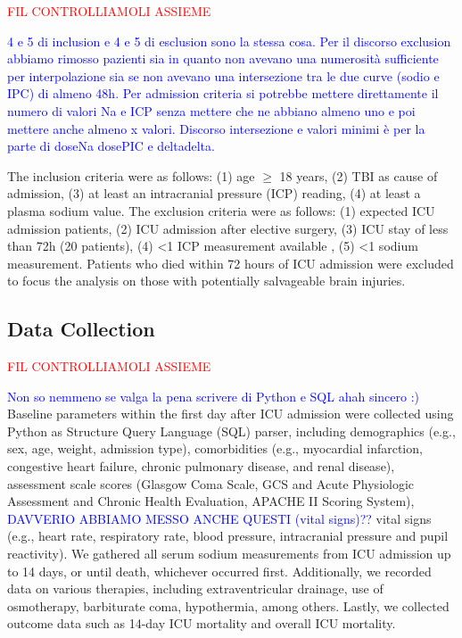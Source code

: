 \textcolor{red}{FIL CONTROLLIAMOLI ASSIEME}

\textcolor{blue}{4 e 5 di inclusion e 4 e 5 di esclusion sono la stessa cosa. Per il discorso exclusion abbiamo rimosso pazienti sia in quanto non avevano una numerosità sufficiente per interpolazione sia se non avevano una intersezione tra le due curve (sodio e IPC) di almeno 48h. Per admission criteria si potrebbe mettere direttamente il numero di valori Na e ICP senza mettere che ne abbiano almeno uno e poi mettere anche almeno x valori.
Discorso intersezione e valori minimi è per la parte di doseNa dosePIC e deltadelta.}

The inclusion criteria were as follows: (1) age $\geq$ 18 years, (2) TBI as cause of admission, (3) at least an intracranial pressure (ICP) reading, (4) at least a plasma sodium value.
The exclusion criteria were as follows: (1) expected ICU admission patients, (2) ICU admission after elective surgery, (3) ICU stay of less than 72h (20 patients), (4) <1 ICP measurement available , (5) <1 sodium measurement. Patients who died within 72 hours of ICU admission were excluded to focus the analysis on those with potentially salvageable brain injuries.

\subsection{Data Collection}
\textcolor{red}{FIL CONTROLLIAMOLI ASSIEME}

\textcolor{blue}{Non so nemmeno se valga la pena scrivere di Python e SQL ahah sincero :)}
Baseline parameters within the first day after ICU admission were collected using Python as  Structure Query Language (SQL) parser, including demographics (e.g., sex, age, weight, admission type), comorbidities (e.g., myocardial infarction, congestive heart failure, chronic pulmonary disease, and renal disease), assessment scale scores (Glasgow Coma Scale, GCS and Acute Physiologic Assessment and Chronic Health Evaluation, APACHE II Scoring System), \textcolor{blue}{DAVVERIO ABBIAMO MESSO ANCHE QUESTI (vital signs)??} vital signs (e.g., heart rate, respiratory rate, blood pressure, intracranial pressure and pupil reactivity). 
We gathered all serum sodium measurements from ICU admission up to 14 days, or until death, whichever occurred first. Additionally, we recorded data on various therapies, including extraventricular drainage, use of osmotherapy, barbiturate coma, hypothermia, among others. Lastly, we collected outcome data such as 14-day ICU mortality and overall ICU mortality.

